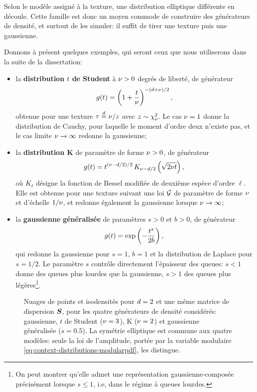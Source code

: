\begin{remark}
  Selon le modèle assigné à la texture, une distribution elliptique différente en découle. Cette famille est donc un moyen commode de construire des générateurs de densité, et surtout de les simuler: il suffit de tirer une texture puis une gaussienne.
\end{remark}

Donnons à présent quelques exemples, qui seront ceux que nous utiliserons dans la suite de la dissertation:

\begin{itemize}
  \item la \textbf{distribution $t$ de Student} à $\nu>0$ degrés de liberté, de générateur
  $$
  g(t) = \left(1+\frac{t}{\nu}\right)^{-(d+\nu)/2},
  $$
  obtenue pour une texture $\tau\overset{d}{=}\nu/z$ avec $z\sim\chi^2_\nu$. Le cas $\nu=1$ donne la distribution de Cauchy, pour laquelle le moment d'ordre deux n'existe pas, et le cas limite $\nu\to\infty$ redonne la gaussienne;

  \item la \textbf{distribution K} de paramètre de forme $\nu>0$, de générateur
  $$
  g(t) = t^{(\nu-d/2)/2}\,K_{\nu-d/2}\left(\sqrt{2\nu t}\right),
  $$
  où $K_\ell$ désigne la fonction de Bessel modifiée de deuxième espèce d'ordre $\ell$. Elle est obtenue pour une texture suivant une loi $\mathcal{G}$ de paramètre de forme $\nu$ et d'échelle $1/\nu$, et redonne également la gaussienne lorsque $\nu\to\infty$;

  \item la \textbf{gaussienne généralisée} de paramètres $s>0$ et $b>0$, de générateur
  $$
  g(t) = \exp\left(-\frac{t^s}{2b}\right),
  $$
  qui redonne la gaussienne pour $s=1,\,b=1$ et la distribution de Laplace pour $s=1/2$. Le paramètre $s$ contrôle directement l'épaisseur des queues: $s<1$ donne des queues plus lourdes que la gaussienne, $s>1$ des queues plus légères\footnote{On peut montrer qu'elle admet une représentation gaussienne-composée précisément lorsque $s\leq 1$, i.e, dans le régime à queues lourdes.}.
\end{itemize}

\begin{figure}[h]
  \begin{center}
    
  \end{center}
  \provEllipticaltailsQR[.5cm]
  \caption{Nuages de points et isodensités pour $d=2$ et une même matrice de dispersion $\boldsymbol{S}$, pour les quatre générateurs de densité considérés: gaussienne, $t$ de Student ($\nu=3$), K ($\nu=2$) et gaussienne généralisée ($s=0.5$). La symétrie elliptique est commune aux quatre modèles: seule la loi de l'amplitude, portée par la variable modulaire \cref{eq:context-distributions-modularpdf}, les distingue. \provEllipticaltails}
  \label{fig:context-distributions-ellipticaltails}
\end{figure}


